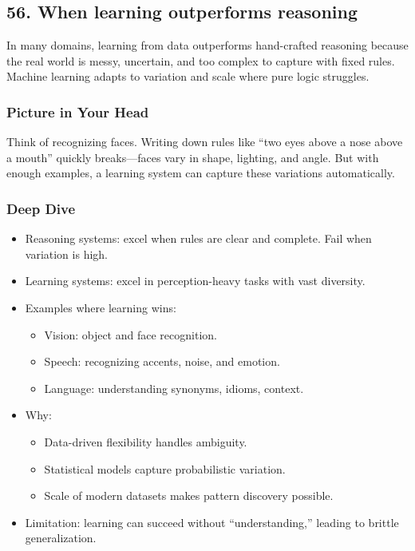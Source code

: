 \documentclass[
  letterpaper,
  DIV=11,
  numbers=noendperiod]{scrreprt}
\providecommand{\tightlist}{%
  \setlength{\itemsep}{0pt}\setlength{\parskip}{0pt}}
\begin{document}
\subsection{56. When learning outperforms
reasoning}\label{when-learning-outperforms-reasoning}

In many domains, learning from data outperforms hand-crafted reasoning
because the real world is messy, uncertain, and too complex to capture
with fixed rules. Machine learning adapts to variation and scale where
pure logic struggles.

\subsubsection{Picture in Your Head}\label{picture-in-your-head-55}

Think of recognizing faces. Writing down rules like ``two eyes above a
nose above a mouth'' quickly breaks---faces vary in shape, lighting, and
angle. But with enough examples, a learning system can capture these
variations automatically.

\subsubsection{Deep Dive}\label{deep-dive-55}

\begin{itemize}
\item
  Reasoning systems: excel when rules are clear and complete. Fail when
  variation is high.
\item
  Learning systems: excel in perception-heavy tasks with vast diversity.
\item
  Examples where learning wins:

  \begin{itemize}
  \tightlist
  \item
    Vision: object and face recognition.
  \item
    Speech: recognizing accents, noise, and emotion.
  \item
    Language: understanding synonyms, idioms, context.
  \end{itemize}
\item
  Why:

  \begin{itemize}
  \tightlist
  \item
    Data-driven flexibility handles ambiguity.
  \item
    Statistical models capture probabilistic variation.
  \item
    Scale of modern datasets makes pattern discovery possible.
  \end{itemize}
\item
  Limitation: learning can succeed without ``understanding,'' leading to
  brittle generalization.
\end{itemize}
\end{document}
